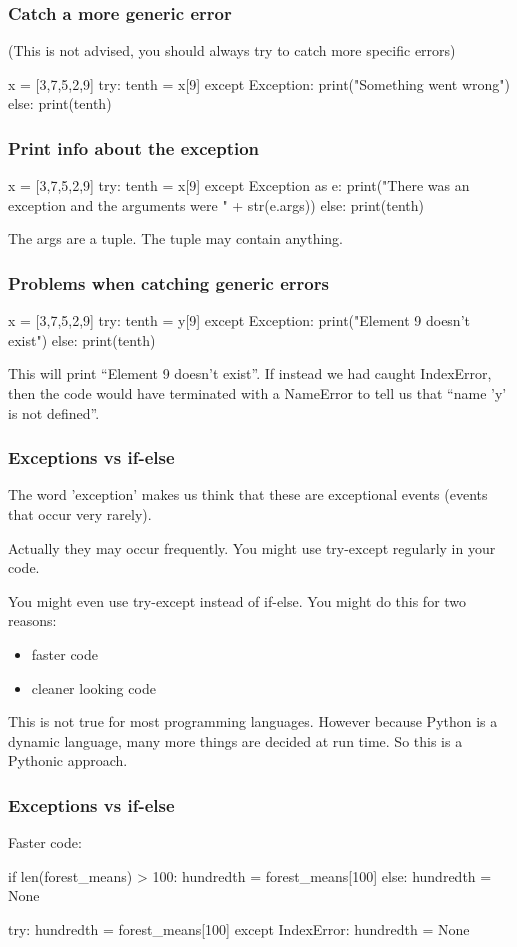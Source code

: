 \documentclass{beamer}
\begin{document}
\begin{frame}[fragile]
\frametitle{Catch a more generic error}
(This is not advised, you should always try to catch more specific errors)
\begin{code}
x = [3,7,5,2,9]
try:
   tenth = x[9]
except Exception:
   print("Something went wrong")
else:
   print(tenth)
\end{code}
\end{frame}

\begin{frame}[fragile]
\frametitle{Print info about the exception}
\begin{code}
x = [3,7,5,2,9]
try:
   tenth = x[9]
except Exception as e:
   print("There was an exception and the arguments were " 
            + str(e.args))
else:
   print(tenth)
\end{code}
The args are a tuple. The tuple may contain anything.
\end{frame}

\begin{frame}[fragile]
\frametitle{Problems when catching generic errors}
\begin{code}
x = [3,7,5,2,9]
try:
   tenth = y[9]
except Exception:
   print("Element 9 doesn't exist")
else:
   print(tenth)
\end{code}
This will print ``Element 9 doesn't exist''. If instead we had
caught IndexError, then the code would have terminated with a
NameError to tell us that ``name 'y' is not defined''.
\end{frame}

\begin{frame}[fragile]
\frametitle{Exceptions vs if-else}
The word 'exception' makes us think that these are exceptional
events (events that occur very rarely).

Actually they may occur frequently. You might use try-except regularly
in your code.

You might even use try-except instead of if-else. You might do this for two
reasons:
\begin{itemize}
\item faster code
\item cleaner looking code
\end{itemize}
This is not true for most programming languages. However because
Python is a dynamic language, many more things are decided at run
time. So this is a Pythonic approach.
\end{frame}

\begin{frame}[fragile]
\frametitle{Exceptions vs if-else}
Faster code:
\begin{code}
if len(forest_means) > 100:
   hundredth = forest_means[100]
else:
   hundredth = None
\end{code}

\bigskip

\begin{code}
try:
   hundredth = forest_means[100]
except IndexError:
   hundredth = None
\end{code}
\end{frame}
\end{document}
